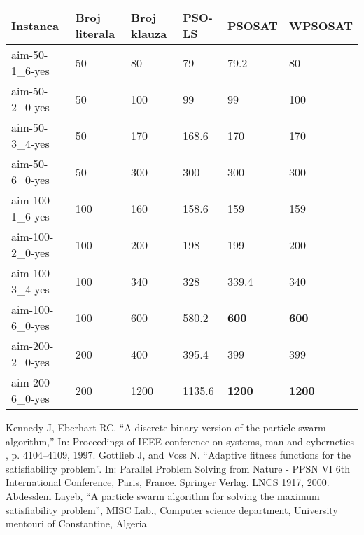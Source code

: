 \documentclass{article}
\begin{document}
\begin{table}
\centering
\begin{tabular}{ |p{3cm}|p{2cm}|p{2cm}||p{2cm}|p{2cm}|p{2cm}|  }
 \hline
 Instanca & Broj literala & Broj klauza & PSO-LS & PSOSAT & WPSOSAT\\
 \hline
 aim-50-1\_6-yes & 50 & 80 & 79 & 79.2 & 80\\
 \hline
 aim-50-2\_0-yes & 50 & 100 & 99 & 99 & 100\\
 \hline
 aim-50-3\_4-yes & 50 & 170 & 168.6 & 170 & 170\\
 \hline
 aim-50-6\_0-yes & 50 & 300 & 300 & 300 & 300\\
 \hline
 \hline
 aim-100-1\_6-yes & 100 & 160 & 158.6 & 159 & 159\\
 \hline
 aim-100-2\_0-yes & 100 & 200 & 198 & 199 & 200\\
 \hline
 aim-100-3\_4-yes & 100 & 340 & 328 & 339.4 & 340\\
 \hline
 aim-100-6\_0-yes & 100 & 600 & 580.2 & \textbf{600} & \textbf{600}\\
 \hline
 \hline
 aim-200-2\_0-yes & 200 & 400 & 395.4 & 399 & 399\\
 \hline
 aim-200-6\_0-yes & 200 & 1200 & 1135.6 & \textbf{1200} & \textbf{1200}\\
 \hline
\end{tabular}
\label{tab:SAT} 
\end{table}



\newpage
\begin{thebibliography}{9}
Kennedy J, Eberhart RC. “A discrete binary version of the particle swarm algorithm,” In: Proceedings of IEEE conference on systems, man and cybernetics , p. 4104–4109, 1997.
 Gottlieb J, and Voss N. “Adaptive fitness functions for the satisfiability problem”. In: Parallel Problem Solving from Nature - PPSN VI 6th International Conference, Paris, France. Springer Verlag. LNCS 1917, 2000.
\bibitem{} Abdesslem Layeb, “A particle swarm algorithm for solving the maximum satisfiability problem”, MISC Lab., Computer science department, University mentouri of Constantine, Algeria
\end{thebibliography}
\end{document}
